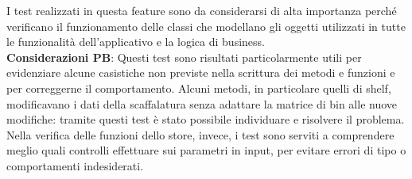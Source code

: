 \noindent I test realizzati in questa feature sono da considerarsi di alta importanza perché verificano il funzionamento delle classi che modellano gli oggetti utilizzati in tutte le funzionalità dell'applicativo e la logica di business.
\vspace{0.2cm} \\ \textbf{Considerazioni PB}: Questi test sono risultati particolarmente utili per evidenziare alcune casistiche non previste nella scrittura dei metodi e funzioni e per correggerne il comportamento. Alcuni metodi, in particolare quelli di shelf, modificavano i dati della scaffalatura senza adattare la matrice di bin alle nuove modifiche: tramite questi test è stato possibile individuare e risolvere il problema. Nella verifica delle funzioni dello store, invece, i test sono serviti a comprendere meglio quali controlli effettuare sui parametri in input, per evitare errori di tipo o comportamenti indesiderati.


